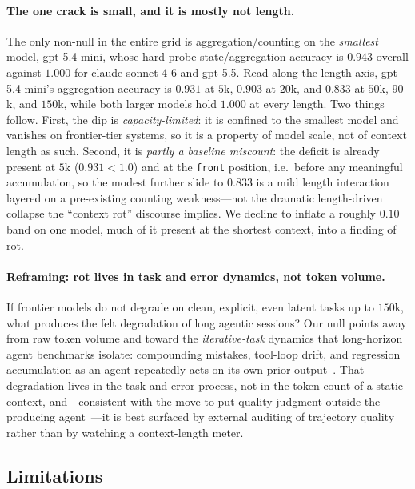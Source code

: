 \documentclass[11pt]{article}
\begin{document}
\paragraph{The one crack is small, and it is mostly not length.}
The only non-null in the entire grid is aggregation/counting on the \emph{smallest}
model, gpt-5.4-mini, whose hard-probe state/aggregation accuracy is $0.943$ overall
against $1.000$ for claude-sonnet-4-6 and gpt-5.5. Read along the length axis,
gpt-5.4-mini's aggregation accuracy is $0.931$ at $5$k, $0.903$ at $20$k, and
$0.833$ at $50$k, $90$k, and $150$k, while both larger models hold $1.000$ at every
length. Two things follow. First, the dip is \emph{capacity-limited}: it is confined
to the smallest model and vanishes on frontier-tier systems, so it is a property of
model scale, not of context length as such. Second, it is \emph{partly a baseline
miscount}: the deficit is already present at $5$k ($0.931<1.0$) and at the
\texttt{front} position, i.e.\ before any meaningful accumulation, so the modest
further slide to $0.833$ is a mild length interaction layered on a pre-existing
counting weakness---not the dramatic length-driven collapse the ``context rot''
discourse implies. We decline to inflate a roughly $0.10$ band on one model, much of
it present at the shortest context, into a finding of rot.

\paragraph{Reframing: rot lives in task and error dynamics, not token volume.}
If frontier models do not degrade on clean, explicit, even latent tasks up to
$150$k, what produces the felt degradation of long agentic sessions? Our null
points away from raw token volume and toward the \emph{iterative-task} dynamics that
long-horizon agent benchmarks isolate: compounding mistakes, tool-loop drift, and
regression accumulation as an agent repeatedly acts on its own prior
output~\cite{orlanski2026slopcodebench}. That degradation lives in the task and
error process, not in the token count of a static context, and---consistent with the
move to put quality judgment outside the producing agent~\cite{srinivasan2026searchdiscipline}---it
is best surfaced by external auditing of trajectory quality rather than by watching a
context-length meter.

\subsection{Limitations}
\label{sec:limitations-discussion}
\end{document}
